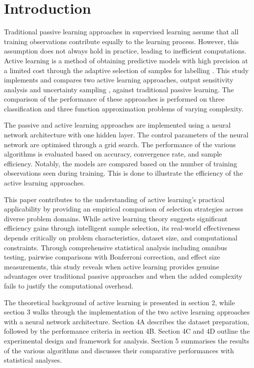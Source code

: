 \documentclass[10pt, conference]{IEEEtran}
\begin{document}
\section{Introduction}
Traditional passive learning approaches in supervised learning assume that all training observations contribute equally to the learning process. However, this assumption does not always hold in practice, leading to inefficient computations. Active learning is a method of obtaining predictive models with high precision at a limited cost through the adaptive selection of samples for labelling \cite{Hino2020ActiveLP}. This study implements and compares two active learning approaches, output sensitivity analysis \cite{sasla} and uncertainty sampling \cite{alus}, against traditional passive learning. The comparison of the performance of these approaches is performed on three classification and three function approximation problems of varying complexity. 

The passive and active learning approaches are implemented using a neural network architecture with one hidden layer. The control parameters of the neural network are optimised through a grid search. The performance of the various algorithms is evaluated based on accuracy, convergence rate, and sample efficiency. Notably, the models are compared based on the number of training observations seen during training. This is done to illustrate the efficiency of the active learning approaches.

This paper contributes to the understanding of active learning's practical applicability by providing an empirical comparison of selection strategies across diverse problem domains. While active learning theory suggests significant efficiency gains through intelligent sample selection, its real-world effectiveness depends critically on problem characteristics, dataset size, and computational constraints. Through comprehensive statistical analysis including omnibus testing, pairwise comparisons with Bonferroni correction, and effect size measurements, this study reveals when active learning provides genuine advantages over traditional passive approaches and when the added complexity fails to justify the computational overhead.

The theoretical background of active learning is presented in section 2, while section 3 walks through the implementation of the two active learning approaches with a neural network architecture. Section 4A describes the dataset preparation, followed by the performance criteria in section 4B. Section 4C and 4D outline the experimental design and framework for analysis. Section 5 summarises the results of the various algorithms and discusses their comparative performances with statistical analyses.
\end{document}
